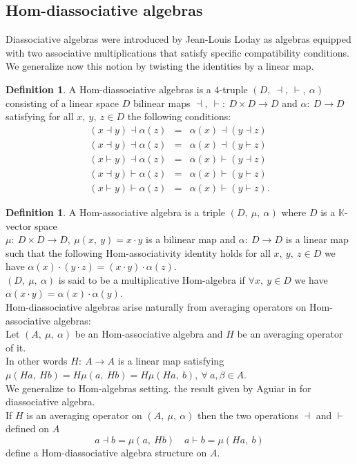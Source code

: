 \documentclass[11pt,twoside,reqno]{amsart}
\theoremstyle{plain}
\theoremstyle{definition}
\newtheorem{definition}[thm]{Definition}
\def\b{\beta}
\begin{document}
\subsection{ Hom-diassociative algebras}
Diassociative algebras were introduced by Jean-Louis Loday \cite{L} as algebras equipped with two associative multiplications that satisfy specific compatibility conditions. We generalize now this notion by twisting the identities by a linear map.
 \begin{definition}\label{d6}
A Hom-diassociative algebras is a $4$-truple $(D,\  \dashv,\  \vdash,\  \alpha)$ consisting of a  linear space $D$  bilinear maps
 $\dashv ,\ \vdash:\ D\times D \longrightarrow D$ and  $\alpha :\ D\longrightarrow D$ satisfying  for all $x  ,\ y,\  z\in D$ 
the following conditions: 
\begin{eqnarray}
(x\dashv y)\dashv\alpha(z)&=&\alpha(x)\dashv(y\dashv z) \label{eq4}\\
(x\dashv y)\dashv\alpha(z)&=&\alpha(x)\dashv(y\vdash z) \label{eq5}\\
(x\vdash y)\dashv\alpha(z)&=&\alpha(x)\vdash(y\dashv z) \label{eq6}\\
(x\dashv y)\vdash\alpha(z)&=&\alpha(x)\vdash(y\vdash z) \label{eq7}\\
(x\vdash y)\vdash\alpha(z)&=&\alpha(x)\vdash(y\vdash z).\label{eq8}
\end{eqnarray}
\end{definition}
\begin{definition}\label{d3}
A Hom-associative algebra is a triple $(D ,\  \mu,\   \alpha)$  where
$D$ is a $\mathbb{K}$-vector space  \\$\mu :\ D \times D \to D ,\  \mu(x,\  y) = x \cdot y$ is a bilinear map   and $\alpha : \ D \to D $ is a linear map  such that the following Hom-associativity identity holds for all $x,\ y,\  z \in D$ we have
$\alpha(x) \cdot (y \cdot z) = (x \cdot y) \cdot \alpha(z)$. \\$(D ,\  \mu,\   \alpha)$ is said to be a multiplicative Hom-algebra if $\forall x ,\ y \in D$ we have $\alpha(x\cdot y)=\alpha(x)\cdot\alpha(y).$\\
Hom-diassociative algebras arise naturally from averaging operators on Hom-associative algebras:\\
 Let $(A ,\ \mu ,\ \alpha)$ be an Hom-associative algebra and $H$ be an averaging operator of it.\\ In other words 
 $H :\ A\to A$ is a linear map satisfying
 $\mu(Ha ,\ Hb) = H\mu(a ,\ Hb) = H\mu(Ha,\  b)  ,\ \forall\ a  ,\b \in A.$\\
We generalize to Hom-algebras setting. the result given by Aguiar in \cite{AG} for diassociative algebra. \\If  \( H \) is an averaging operator on \( (A ,\ \mu ,\ \alpha) \)  then the two operations \( \dashv \) and \( \vdash \) defined on \( A \)  $$a \dashv b =\mu(a,\  Hb)  \quad a \vdash b = \mu(Ha,\  b) $$
define a Hom-diassociative algebra structure on \( A \).
\end{definition}
\end{document}
